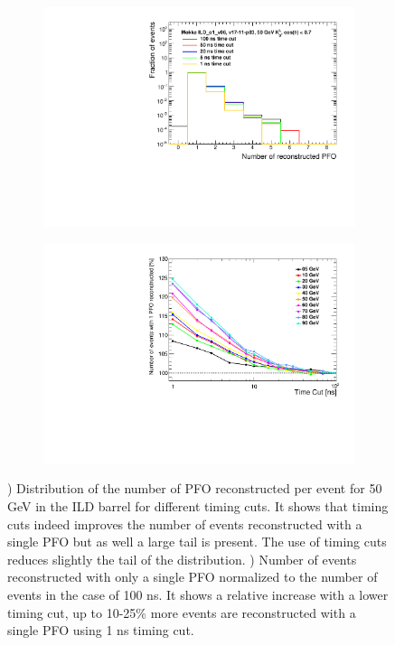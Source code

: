 \begin{figure}[htbp!]
  \centering
  \begin{subfigure}[t]{0.49\textwidth}
    \centering
    \includegraphics[width=1\linewidth]{../Thesis_Plots/ILD/AdditionalPlots/Plots/NumberReconstructedPFO_TimeCuts_50GeV}
    \caption{} \label{fig:DistriPFO}
  \end{subfigure}
  \hfill
  \begin{subfigure}[t]{0.49\textwidth}
    \centering
    \includegraphics[width=1\linewidth]{../Thesis_Plots/ILD/NoSmearing/Plots/NumberEvents_PFO_TimeCuts_noSmearing}
    \caption{} \label{fig:EventRecoPFO}
  \end{subfigure}
  \caption{) Distribution of the number of PFO reconstructed per event for 50 GeV \kzeroL{} in the ILD barrel for different timing cuts. It shows that timing cuts indeed improves the number of events reconstructed with a single PFO but as well a large tail is present. The use of timing cuts reduces slightly the tail of the distribution. ) Number of events reconstructed with only a single PFO normalized to the number of events in the case of 100 ns. It shows a relative increase with a lower timing cut, up to 10-25\% more events are reconstructed with a single PFO using 1 ns timing cut.}
\end{figure}


